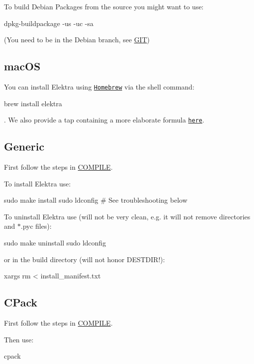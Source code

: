 To build Debian Packages from the source you might want to use\+: \begin{DoxyVerb}    dpkg-buildpackage -us -uc -sa
\end{DoxyVerb}


(You need to be in the Debian branch, see \hyperlink{doc_GIT_md}{G\+IT})

\subsection*{mac\+OS}

You can install Elektra using \href{http://brew.sh}{\tt Homebrew} via the shell command\+:


\begin{DoxyCode}
brew install elektra
\end{DoxyCode}


. We also provide a tap containing a more elaborate formula \href{http://github.com/ElektraInitiative/homebrew-elektra}{\tt here}.

\subsection*{Generic}

First follow the steps in \hyperlink{doc_COMPILE_md}{C\+O\+M\+P\+I\+LE}.

To install Elektra use\+: \begin{DoxyVerb}    sudo make install
    sudo ldconfig  # See troubleshooting below
\end{DoxyVerb}


To uninstall Elektra use (will not be very clean, e.\+g. it will not remove directories and {\ttfamily $\ast$.pyc} files)\+: \begin{DoxyVerb}    sudo make uninstall
    sudo ldconfig
\end{DoxyVerb}


or in the build directory (will not honor D\+E\+S\+T\+D\+I\+R!)\+: \begin{DoxyVerb}    xargs rm < install_manifest.txt
\end{DoxyVerb}


\subsection*{C\+Pack}

First follow the steps in \hyperlink{doc_COMPILE_md}{C\+O\+M\+P\+I\+LE}.

Then use\+: \begin{DoxyVerb}    cpack
\end{DoxyVerb}


